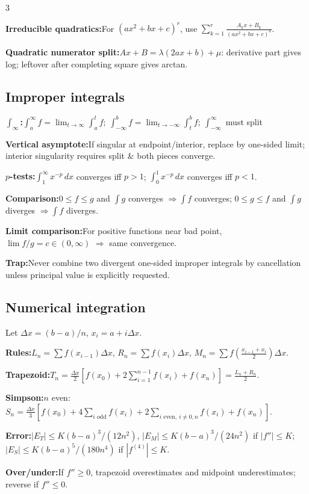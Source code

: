 \documentclass[10pt]{article}
\newcommand{\dx}{\,dx}
\newenvironment{cheatitems}{\par\vspace{-2pt}}{\par\vspace{-2pt}}
\newcommand{\cheatrow}[2]{%
  \par\noindent\textbf{#1:}\nobreak\hspace{0.25em}#2\par
}
\begin{document}
\begin{multicols}{3}
\begin{cheatitems}
\cheatrow{Irreducible quadratics}{For $(ax^2+bx+c)^r$, use $\sum_{k=1}^r\frac{A_kx+B_k}{(ax^2+bx+c)^k}$.}
\cheatrow{Quadratic numerator split}{$Ax+B=\lambda(2ax+b)+\mu$: derivative part gives log; leftover after completing square gives arctan.}
\end{cheatitems}

\subsection*{Improper integrals}
\begin{cheatitems}
\cheatrow{$\displaystyle\int_\infty$}{$\displaystyle\int_a^{\infty}f=\lim_{t\to\infty}\int_a^t f;\ \int_{-\infty}^b f=\lim_{t\to-\infty}\int_t^b f;\ \int_{-\infty}^{\infty}$ must split}
\cheatrow{Vertical asymptote}{If singular at endpoint/interior, replace by one-sided limit; interior singularity requires split \& both pieces converge.}
\cheatrow{$p$-tests}{$\int_1^\infty x^{-p}\dx$ converges iff $p>1$; $\int_0^1x^{-p}\dx$ converges iff $p<1$.}
\cheatrow{Comparison}{$0\le f\le g$ and $\int g$ converges $\Rightarrow\int f$ converges; $0\le g\le f$ and $\int g$ diverges $\Rightarrow\int f$ diverges.}
\cheatrow{Limit comparison}{For positive functions near bad point, $\lim f/g=c\in(0,\infty)$ $\Rightarrow$ same convergence.}
\cheatrow{Trap}{Never combine two divergent one-sided improper integrals by cancellation unless principal value is explicitly requested.}
\end{cheatitems}

\subsection*{Numerical integration}
Let $\Delta x=(b-a)/n$, $x_i=a+i\Delta x$.
\begin{cheatitems}
\cheatrow{Rules}{$L_n=\sum f(x_{i-1})\Delta x$, $R_n=\sum f(x_i)\Delta x$, $M_n=\sum f(\frac{x_{i-1}+x_i}{2})\Delta x$.}
\cheatrow{Trapezoid}{$T_n=\frac{\Delta x}{2}[f(x_0)+2\sum_{i=1}^{n-1}f(x_i)+f(x_n)]=\frac{L_n+R_n}{2}$.}
\cheatrow{Simpson}{$n$ even: $S_n=\frac{\Delta x}{3}[f(x_0)+4\sum_{i\text{ odd}}f(x_i)+2\sum_{i\text{ even},\ i\ne0,n}f(x_i)+f(x_n)]$.}
\cheatrow{Error}{$|E_T|\le K(b-a)^3/(12n^2)$, $|E_M|\le K(b-a)^3/(24n^2)$ if $|f''|\le K$; $|E_S|\le K(b-a)^5/(180n^4)$ if $|f^{(4)}|\le K$.}
\cheatrow{Over/under}{If $f''\ge0$, trapezoid overestimates and midpoint underestimates; reverse if $f''\le0$.}
\end{cheatitems}


\end{multicols}
\end{document}
